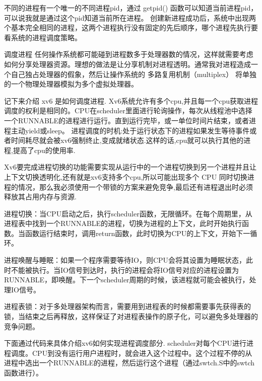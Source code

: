\documentclass[a4paper,12pt]{report}
\begin{document}
不同的进程有一个唯一的不同进程pid，通过 getpid() 函数可以知道当前进程pid，可以说我就是通过这个pid知道当前所在进程。
创建新进程成功后，系统中出现两个基本完全相同的进程，这两个进程执行没有固定的先后顺序，哪个进程先执行要看系统的进程调度策略。

调度进程
任何操作系统都可能碰到进程数多于处理器数的情况，这样就需要考虑如何分享处理器资源。理想的做法是让分享机制对进程透明。通常我对进程造成一个自己独占处理器的假象，然后让操作系统的 多路复用机制（multiplex） 将单独的一个物理处理器模拟为多个虚拟处理器。

记下来介绍 xv6 是如何调度进程.
Xv6系统允许有多个cpu,并且每一个cpu获取进程调度的权利是相同的。CPU在scheduler里面进行轮询操作，每次从线程池中选择一个RUNNABLE的进程进行运行。直到运行完毕，或一单位时间片结束，或者进程主动yield或sleep。
进程调度的时机:处于运行状态下的进程如果发生等待事件或者时间耗尽就会被xv6强制终止,变成就绪状态.这样的话,cpu就可以执行其他的进程,提高了cpu的使用率.

Xv6要完成进程切换的功能需要实现从运行中的一个进程切换到另一个进程并且让上下文切换透明化,还有就是xv6支持多个cpu,所以可能出现多个 CPU 同时切换进程的情况，那么我必须使用一个带锁的方案来避免竞争,最后还有进程退出时必须释放其占用内存与资源.

进程切换：当CPU启动之后，执行scheduler函数，无限循环。在每个周期里，从进程表中找到一个RUNNABLE的进程，切换为进程的上下文，此时开始执行函数。当函数运行结束时，调用return函数，此时切换为CPU的上下文，开始下一循环。

进程唤醒与睡眠：如果一个程序需要等待IO，则CPU会将其设置为睡眠状态，此时不能被执行。当IO信号到达时，执行的进程会将IO信号对应的进程设置为RUNNABLE，即唤醒。下一个scheduler周期的时候，该进程就可能会被执行，处理IO信号。

进程表锁：对于多处理器架构而言，需要用到进程表的时候都需要事先获得表的锁，当结束之后再释放，这样保证了对进程表操作的原子化，可以避免多处理器的竞争问题。


下面通过代码来具体介绍xv6如何实现进程调度部分.
scheduler对每个CPU进行进程调度。CPU到没有运行用户进程时，就会进入这个过程中。这个过程不停的从进程中选出一个RUNNABLE的进程，然后运行这个进程（通过swtch.S中的swtch函数进行）。
\end{document}
